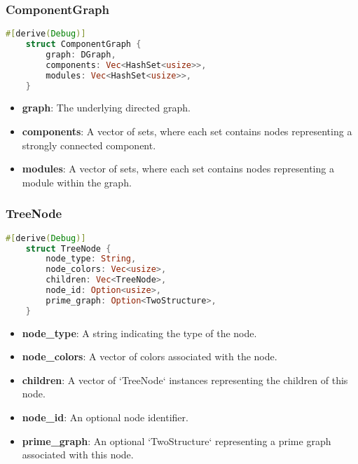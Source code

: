 \subsubsection{ComponentGraph}

\begin{lstlisting}[language=Rust, style=rust, caption={Defining the Component Graph with Rust}, label={lst:rust-define-component-graph}, firstnumber=1]
    #[derive(Debug)]
    struct ComponentGraph {
        graph: DGraph,
        components: Vec<HashSet<usize>>,
        modules: Vec<HashSet<usize>>,
    }
\end{lstlisting}

\begin{itemize}
    \item \textbf{graph}: The underlying directed graph.
    \item \textbf{components}: A vector of sets, where each set contains nodes representing a strongly connected component.
    \item \textbf{modules}: A vector of sets, where each set contains nodes representing a module within the graph.
\end{itemize}

\subsubsection{TreeNode}

\begin{lstlisting}[language=Rust, style=rust, caption={Defining the TreeNode with Rust}, label={lst:rust-define-treenode}, firstnumber=1]
    #[derive(Debug)]
    struct TreeNode {
        node_type: String,
        node_colors: Vec<usize>,
        children: Vec<TreeNode>,
        node_id: Option<usize>,
        prime_graph: Option<TwoStructure>,
    }
\end{lstlisting}

\begin{itemize}
    \item \textbf{node\_type}: A string indicating the type of the node.
    \item \textbf{node\_colors}: A vector of colors associated with the node.
    \item \textbf{children}: A vector of `TreeNode` instances representing the children of this node.
    \item \textbf{node\_id}: An optional node identifier.
    \item \textbf{prime\_graph}: An optional `TwoStructure` representing a prime graph associated with this node.
\end{itemize}

